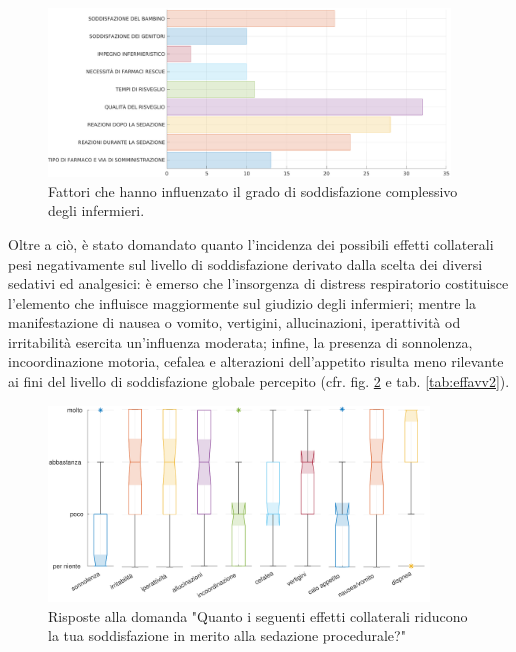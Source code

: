 \begin{figure}[!h]
    \centering
    \includegraphics[width=0.95\textwidth]{Figure/soddisfazione-globale.eps}
    \caption{Fattori che hanno influenzato il grado di soddisfazione complessivo degli infermieri.}
    \label{fig:soddglobale}
\end{figure}


Oltre a ciò, è stato domandato quanto l'incidenza dei possibili effetti collaterali pesi negativamente sul livello di soddisfazione derivato dalla scelta dei diversi sedativi ed analgesici: è emerso che l'insorgenza di distress respiratorio costituisce l'elemento che influisce maggiormente sul giudizio degli infermieri; mentre la manifestazione di nausea o vomito, vertigini, allucinazioni, iperattività od irritabilità esercita un'influenza moderata; infine, la presenza di sonnolenza, incoordinazione motoria, cefalea e alterazioni dell'appetito risulta meno rilevante ai fini del livello di soddisfazione globale percepito (cfr. fig. \ref{fig:influenzaeffetti} e tab. \ref{tab:effavv2}). 

\begin{figure}[h]
    \centering
    \includegraphics[width=0.9\textwidth]{Figure/influenza-effetti.pdf}
    \caption{Risposte alla domanda "Quanto i seguenti effetti collaterali riducono la tua soddisfazione in merito alla sedazione procedurale?"}
    \label{fig:influenzaeffetti}
\end{figure}

